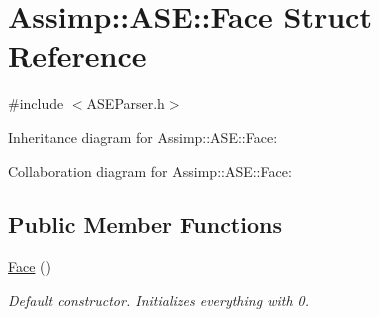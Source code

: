 \hypertarget{struct_assimp_1_1_a_s_e_1_1_face}{\section{Assimp\+:\+:A\+S\+E\+:\+:Face Struct Reference}
\label{struct_assimp_1_1_a_s_e_1_1_face}
}


{\ttfamily \#include $<$A\+S\+E\+Parser.\+h$>$}



Inheritance diagram for Assimp\+:\+:A\+S\+E\+:\+:Face\+:


Collaboration diagram for Assimp\+:\+:A\+S\+E\+:\+:Face\+:
\subsection*{Public Member Functions}
\begin{DoxyCompactItemize}
\item 
\hypertarget{struct_assimp_1_1_a_s_e_1_1_face_a04716ae9d99f09eeeb5f7e214a13426f}{\hyperlink{struct_assimp_1_1_a_s_e_1_1_face_a04716ae9d99f09eeeb5f7e214a13426f}{Face} ()}\label{struct_assimp_1_1_a_s_e_1_1_face_a04716ae9d99f09eeeb5f7e214a13426f}

\begin{DoxyCompactList}\small\item\em Default constructor. Initializes everything with 0. \end{DoxyCompactList}\end{DoxyCompactItemize}
